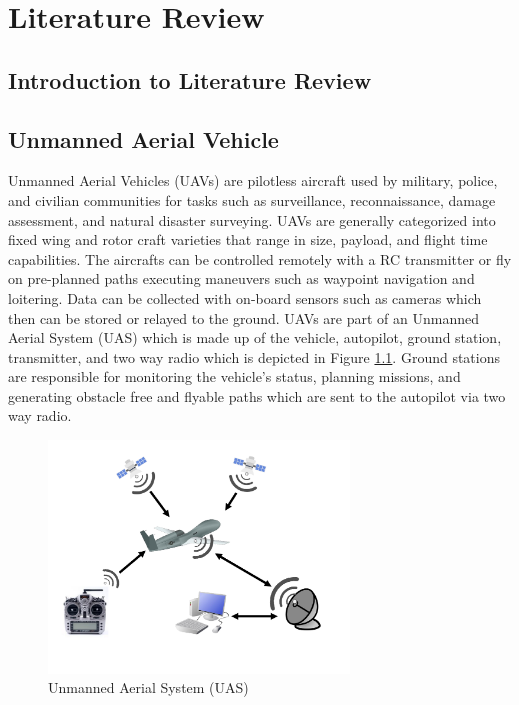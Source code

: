 \documentclass[numbered,pdftex]{ohio-etd}
\begin{document}
\chapter{Literature Review}
\section{Introduction to Literature Review}


\section{Unmanned Aerial Vehicle}

Unmanned Aerial Vehicles (UAVs) are pilotless aircraft used by military, police, and civilian communities for tasks such as surveillance, reconnaissance, damage assessment, and natural disaster surveying.  UAVs are generally categorized into fixed wing and rotor craft varieties that range in size, payload, and flight time capabilities. The aircrafts can be controlled remotely with a RC transmitter or fly on pre-planned paths executing maneuvers such as waypoint navigation and loitering. Data can be collected with on-board sensors such as cameras which then can be stored or relayed to the ground. UAVs are part of an Unmanned Aerial System (UAS) which is made up of the vehicle, autopilot, ground station, transmitter, and two way radio which is depicted in Figure \ref{fig:uas}. Ground stations are responsible for monitoring the vehicle's status, planning missions, and generating obstacle free and flyable paths which are sent to the autopilot via two way radio. 

\begin{figure}
	\centering
	\includegraphics[width=8cm]{PaperFigures/UAS}
	\caption{Unmanned Aerial System (UAS)}
	\label{fig:uas}
\end{figure}
\end{document}
